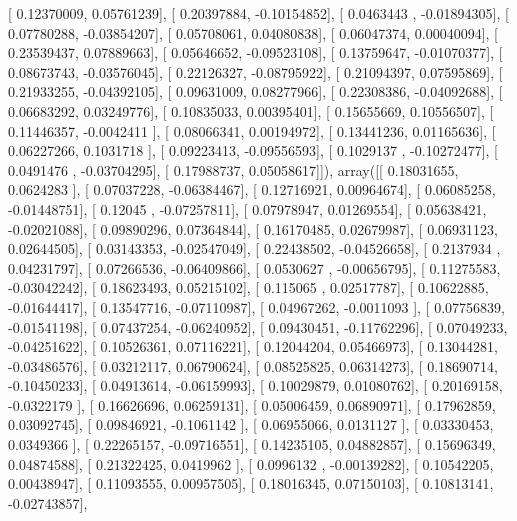 \documentclass{article}
\begin{document}
       [ 0.12370009,  0.05761239],
       [ 0.20397884, -0.10154852],
       [ 0.0463443 , -0.01894305],
       [ 0.07780288, -0.03854207],
       [ 0.05708061,  0.04080838],
       [ 0.06047374,  0.00040094],
       [ 0.23539437,  0.07889663],
       [ 0.05646652, -0.09523108],
       [ 0.13759647, -0.01070377],
       [ 0.08673743, -0.03576045],
       [ 0.22126327, -0.08795922],
       [ 0.21094397,  0.07595869],
       [ 0.21933255, -0.04392105],
       [ 0.09631009,  0.08277966],
       [ 0.22308386, -0.04092688],
       [ 0.06683292,  0.03249776],
       [ 0.10835033,  0.00395401],
       [ 0.15655669,  0.10556507],
       [ 0.11446357, -0.0042411 ],
       [ 0.08066341,  0.00194972],
       [ 0.13441236,  0.01165636],
       [ 0.06227266,  0.1031718 ],
       [ 0.09223413, -0.09556593],
       [ 0.1029137 , -0.10272477],
       [ 0.0491476 , -0.03704295],
       [ 0.17988737,  0.05058617]]), array([[ 0.18031655,  0.0624283 ],
       [ 0.07037228, -0.06384467],
       [ 0.12716921,  0.00964674],
       [ 0.06085258, -0.01448751],
       [ 0.12045   , -0.07257811],
       [ 0.07978947,  0.01269554],
       [ 0.05638421, -0.02021088],
       [ 0.09890296,  0.07364844],
       [ 0.16170485,  0.02679987],
       [ 0.06931123,  0.02644505],
       [ 0.03143353, -0.02547049],
       [ 0.22438502, -0.04526658],
       [ 0.2137934 ,  0.04231797],
       [ 0.07266536, -0.06409866],
       [ 0.0530627 , -0.00656795],
       [ 0.11275583, -0.03042242],
       [ 0.18623493,  0.05215102],
       [ 0.115065  ,  0.02517787],
       [ 0.10622885, -0.01644417],
       [ 0.13547716, -0.07110987],
       [ 0.04967262, -0.0011093 ],
       [ 0.07756839, -0.01541198],
       [ 0.07437254, -0.06240952],
       [ 0.09430451, -0.11762296],
       [ 0.07049233, -0.04251622],
       [ 0.10526361,  0.07116221],
       [ 0.12044204,  0.05466973],
       [ 0.13044281, -0.03486576],
       [ 0.03212117,  0.06790624],
       [ 0.08525825,  0.06314273],
       [ 0.18690714, -0.10450233],
       [ 0.04913614, -0.06159993],
       [ 0.10029879,  0.01080762],
       [ 0.20169158, -0.0322179 ],
       [ 0.16626696,  0.06259131],
       [ 0.05006459,  0.06890971],
       [ 0.17962859,  0.03092745],
       [ 0.09846921, -0.1061142 ],
       [ 0.06955066,  0.0131127 ],
       [ 0.03330453,  0.0349366 ],
       [ 0.22265157, -0.09716551],
       [ 0.14235105,  0.04882857],
       [ 0.15696349,  0.04874588],
       [ 0.21322425,  0.0419962 ],
       [ 0.0996132 , -0.00139282],
       [ 0.10542205,  0.00438947],
       [ 0.11093555,  0.00957505],
       [ 0.18016345,  0.07150103],
       [ 0.10813141, -0.02743857],
\end{document}
